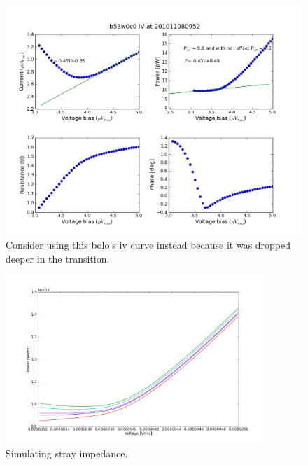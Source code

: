 \begin{figure}[htbp]
\begin{center}
\includegraphics[width=0.99\columnwidth]{figures/b53w0c0_IV_201011080952.png} 
\caption{Consider using this bolo's iv curve instead because it was dropped deeper in the transition.
\label{fig:other_bolo_iv_curve} }
\end{center}
\end{figure}


\begin{figure}[htbp]
\begin{center}
\includegraphics[height=2.5in]{figures/150-02_b53w0c0_messingwithX.png} 
\caption{Simulating stray impedance.
\label{fig:stray_impedance_curve} }
\end{center}
\end{figure}

